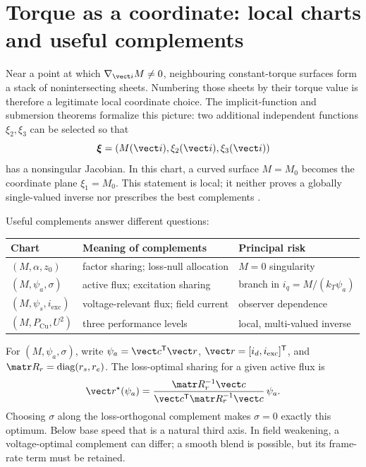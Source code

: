 \section{Torque as a coordinate: local charts and useful complements}
\label{sec:torque-coordinate}

Near a point at which \(\nabla_{\vect i}M\neq0\), neighbouring constant-torque
surfaces form a stack of nonintersecting sheets. Numbering those sheets by
their torque value is therefore a legitimate local coordinate choice. The
implicit-function and submersion theorems formalize this picture: two
additional independent functions \(\xi_2,\xi_3\) can be selected so that
\[
 \boldsymbol\xi=(M(\vect i),\xi_2(\vect i),\xi_3(\vect i))
\]
has a nonsingular Jacobian. In this chart, a curved surface \(M=M_0\) becomes
the coordinate plane \(\xi_1=M_0\). This statement is local; it neither proves
a globally single-valued inverse nor prescribes the best complements
\cite{agrachev2004}.



Useful complements answer different questions:
\begin{center}
\begin{tabular}{lll}
\toprule
Chart & Meaning of complements & Principal risk\\
\midrule
\((M,\alpha,z_0)\) & factor sharing; loss-null allocation & \(M=0\) singularity\\
\((M,\psi_a,\sigma)\) & active flux; excitation sharing & branch in \(i_q=M/(k_T\psi_a)\)\\
\((M,\psi_s,i_{\mathrm{exc}})\) & voltage-relevant flux; field current & observer dependence\\
\((M,P_{\mathrm{Cu}},U^2)\) & three performance levels & local, multi-valued inverse\\
\bottomrule
\end{tabular}
\end{center}

For \((M,\psi_a,\sigma)\), write
\(\psi_a=\vect c^{\mathsf T}\vect r\),
\(\vect r=[i_d,i_{\mathrm{exc}}]^{\mathsf T}\), and
\(\matr R_r=\operatorname{diag}(r_s,r_e)\). The loss-optimal sharing for a
given active flux is
\begin{equation}
 \vect r^\star(\psi_a)=
 \frac{\matr R_r^{-1}\vect c}
 {\vect c^{\mathsf T}\matr R_r^{-1}\vect c}\,\psi_a.
 \label{eq:loss-optimal-sharing}
\end{equation}
Choosing \(\sigma\) along the loss-orthogonal complement makes
\(\sigma=0\) exactly this optimum. Below base speed that is a natural third
axis. In field weakening, a voltage-optimal complement can differ; a smooth
blend is possible, but its frame-rate term must be retained.

